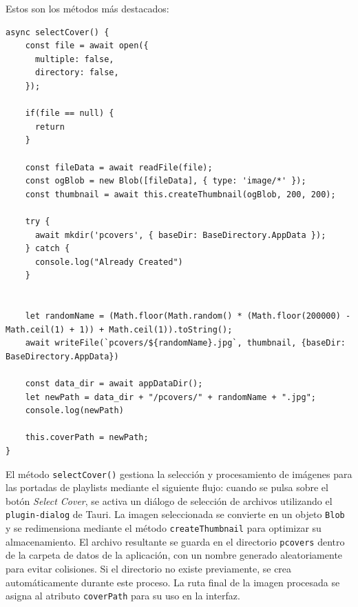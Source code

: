 \documentclass[11pt, a4paper]{article}
\begin{document}
                Estos son los métodos más destacados:

                \begin{lstlisting}[caption={selectCover()}]
async selectCover() {
    const file = await open({
      multiple: false,
      directory: false,
    });

    if(file == null) {
      return
    }

    const fileData = await readFile(file);
    const ogBlob = new Blob([fileData], { type: 'image/*' });
    const thumbnail = await this.createThumbnail(ogBlob, 200, 200);

    try {
      await mkdir('pcovers', { baseDir: BaseDirectory.AppData });
    } catch {
      console.log("Already Created")
    }
    

    let randomName = (Math.floor(Math.random() * (Math.floor(200000) - Math.ceil(1) + 1)) + Math.ceil(1)).toString();
    await writeFile(`pcovers/${randomName}.jpg`, thumbnail, {baseDir: BaseDirectory.AppData})

    const data_dir = await appDataDir();
    let newPath = data_dir + "/pcovers/" + randomName + ".jpg";
    console.log(newPath)

    this.coverPath = newPath;
}
                \end{lstlisting}

                
                El método \verb|selectCover()| gestiona la selección y procesamiento de imágenes para las portadas de playlists mediante el siguiente flujo: cuando se pulsa sobre el botón \textit{Select Cover}, se activa un diálogo de selección de archivos utilizando el \verb|plugin-dialog| de Tauri. La imagen seleccionada se convierte en un objeto \verb|Blob| y se redimensiona mediante el método \verb|createThumbnail| para optimizar su almacenamiento. El archivo resultante se guarda en el directorio \verb|pcovers| dentro de la carpeta de datos de la aplicación, con un nombre generado aleatoriamente para evitar colisiones. Si el directorio no existe previamente, se crea automáticamente durante este proceso. La ruta final de la imagen procesada se asigna al atributo \verb|coverPath| para su uso en la interfaz.
\end{document}
